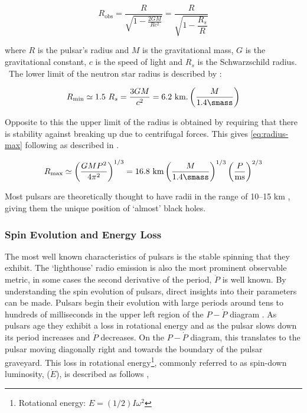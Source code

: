 \begin{equation}
    R_\text{obs} = \frac{R}{\sqrt{1 - \frac{2GM}{Rc^2}}} = \frac{R}{ \sqrt{1 - \dfrac{R_s}{R}}}
\end{equation}

where $R$ is the pulsar's radius and $M$ is the gravitational mass, $G$ is the gravitational constant, $c$ is the speed of light and $R_s$ is the Schwarzschild radius. \
The lower limit of the neutron star radius is described by \cite[p. 58,][]{pulsar_handbook}: 

\begin{equation}
    R_\text{min} \simeq 1.5 \ R_s = \frac{3GM}{c^2} = 6.2 \ \text{km.} \left( \frac{M}{1.4 \smass} \right)
\end{equation}

Opposite to this the upper limit of the radius is obtained by requiring that there is stability against breaking up due to centrifugal forces. This gives \cref{eq:radius-max} following as described in \cite[p.~58,]{pulsar_handbook}. 

\begin{equation}
    R_\text{max} \simeq \left(\frac{GMP^2}{4 \pi^2}\right)^{1/3} = 16.8 \ \text{km} \left( \frac{M}{1.4 \smass} \right)^{1/3} \left( \frac{P}{\text{ms}} \right)^{2/3}
    \label{eq:radius-max}
\end{equation}

Most pulsars are theoretically thought to have radii in the range of 10–15 km \citep{lattimer_neutron_2001}, giving them the unique position of `almost' black holes. 

\subsubsection{Spin Evolution and Energy Loss}
The most well known characteristics of pulsars is the stable spinning that they exhibit. The `lighthouse' radio emission is also the most prominent observable metric, in some cases the second derivative of the period, $\ddot P$ is well known. 
By understanding the spin evolution of pulsars, direct insights into their parameters can be made. Pulsars begin their evolution with large periods around tens to hundreds of milliseconds in the upper left region of the $P-\dot P$ diagram \citep{faucher-giguere_birth_2006}. As pulsars age they exhibit a loss in rotational energy and as the pulsar slows down its period increases and $\dot P$ decreases. On the $P-\dot P$ diagram, this translates to the pulsar moving diagonally right and towards the boundary of the pulsar graveyard. This loss in rotational energy\footnote{Rotational energy: $E=(1/2) I \omega^2$ }, commonly referred to as spin-down luminosity, ($\dot E$), is described as follows \citep[p.~59]{pulsar_handbook}, 

